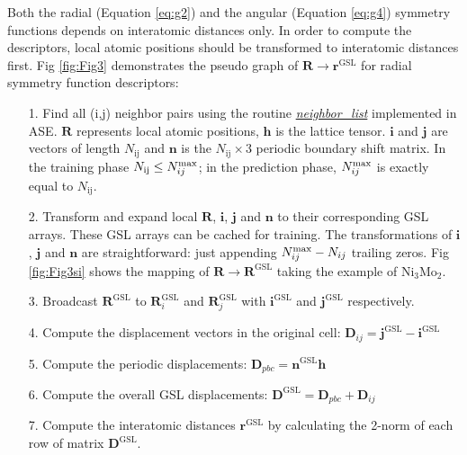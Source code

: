 \documentclass[final,1p,times]{elsarticle}
\begin{document}
Both the radial (Equation \ref{eq:g2}) and the angular (Equation \ref{eq:g4}) 
symmetry functions depends on interatomic distances only. In order to compute 
the descriptors, local atomic positions should be transformed to interatomic 
distances first. Fig \ref{fig:Fig3} demonstrates the pseudo graph of 
$\mathbf{R} \rightarrow \mathbf{r}^{\mathrm{GSL}}$ for radial symmetry function
descriptors: 

\begin{itemize}
    
    \item[1.] 
    Find all (i,j) neighbor pairs using the routine 
    \href{https://wiki.fysik.dtu.dk/ase/ase/neighborlist.html}
    {\textit{neighbor\_list}} implemented in ASE\cite{ase}. $\mathbf{R}$ 
    represents local atomic positions, $\mathbf{h}$ is the lattice tensor. 
    $\mathbf{i}$ and $\mathbf{j}$ are vectors of length $N_{\mathrm{ij}}$ and
    $\mathbf{n}$ is the $N_{\mathrm{ij}} \times 3$ periodic boundary shift 
    matrix. In the training phase $N_{\mathrm{ij}} \le N_{ij}^{\mathrm{max}}$; in the 
    prediction phase, $N_{ij}^{\mathrm{max}}$ is exactly equal to $N_{\mathrm{ij}}$.
    
    \item[2.] 
    Transform and expand local $\mathbf{R}$, $\mathbf{i}$, $\mathbf{j}$ and 
    $\mathbf{n}$ to their corresponding GSL arrays. These GSL arrays can be 
    cached for training. The transformations of $\mathbf{i}$, $\mathbf{j}$ and 
    $\mathbf{n}$ are straightforward: just appending $N_{ij}^{\mathrm{max}} - N_{ij}$ trailing 
    zeros. Fig \ref{fig:Fig3si} shows the mapping of 
    $\mathbf{R} \rightarrow \mathbf{R}^{\mathrm{GSL}}$ taking the example of 
    Ni$_3$Mo$_2$.

    \item[3.] 
    Broadcast $\mathbf{R}^{\mathrm{GSL}}$ to $\mathbf{R}_{i}^{\mathrm{GSL}}$ and
    $\mathbf{R}_{j}^{\mathrm{GSL}}$ with $\mathbf{i}^{\mathrm{GSL}}$ and 
    $\mathbf{j}^{\mathrm{GSL}}$ respectively.

    \item[4.]
    Compute the displacement vectors in the original cell:
    $\mathbf{D}_{ij} = \mathbf{j}^{\mathrm{GSL}} - \mathbf{i}^{\mathrm{GSL}}$
    
    \item[5.]
    Compute the periodic displacements:
    $\mathbf{D}_{pbc} = \mathbf{n}^{\mathrm{GSL}} \mathbf{h}$
    
    \item[6.]
    Compute the overall GSL displacements:
    $\mathbf{D}^{\mathrm{GSL}} = \mathbf{D}_{pbc} + \mathbf{D}_{ij}$
    
    \item[7.] 
    Compute the interatomic distances $\mathbf{r}^{\mathrm{GSL}}$ by calculating
    the 2-norm of each row of matrix $\mathbf{D}^{\mathrm{GSL}}$.

\end{itemize}
\end{document}

